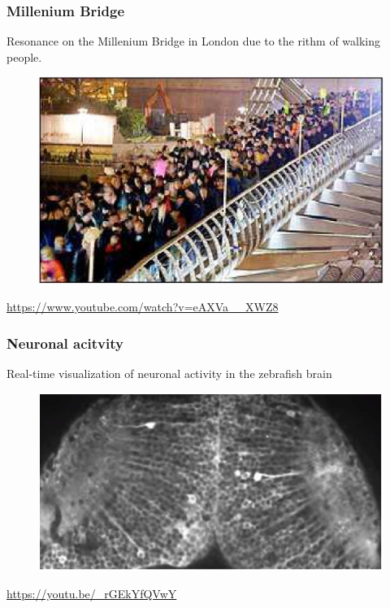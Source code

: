 \documentclass{beamer}
\begin{document}
\begin{frame}
\frametitle{Millenium Bridge}
Resonance on the Millenium Bridge in London due to the rithm of walking people.
\begin{figure}
\includegraphics[scale=0.3]{millenium_bridge}
\end{figure}
\url{https://www.youtube.com/watch?v=eAXVa__XWZ8}
\end{frame}


\begin{frame}
\frametitle{Neuronal acitvity}
Real-time visualization of neuronal activity in the zebrafish brain
\begin{figure}
\includegraphics[scale=0.7]{neuronal_activity}
\end{figure}
\url{https://youtu.be/_rGEkYfQVwY}
\end{frame}

\end{document}
